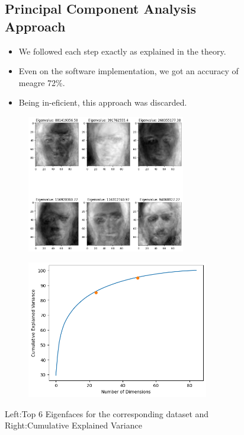 \documentclass{article}
\begin{document}
        \begin{figure}[!hbt]

   \subsection{Principal Component Analysis Approach}

    \begin{itemize}
        \item We followed each step exactly as explained in the theory.

        \item Even on the software implementation, we got an accuracy of meagre 72\%.

        \item Being in-eficient, this approach was discarded.
    \end{itemize}
        
    \begin{subfigure}{0.5\textwidth}
        \centering
        \includegraphics[height=6cm]{pca_eigenfaces.png}
        \hspace{2em}
    \end{subfigure}
    \begin{subfigure}{0.5\textwidth}
        \centering
        \includegraphics[height=6cm]{cum_ex_var.png}
    \end{subfigure}
    
    \caption{Left:Top 6 Eigenfaces for the corresponding dataset and Right:Cumulative Explained Variance}
\end{figure}
\end{document}
